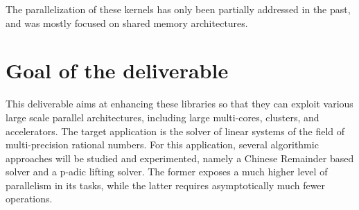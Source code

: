 The parallelization of these kernels has only been partially addressed
in the past, and was mostly focused on shared memory architectures.

\hypertarget{goal-of-the-deliverable}{%
\section*{Goal of the deliverable}\label{goal-of-the-deliverable}}

This deliverable aims at enhancing these libraries so that they can
exploit various large scale parallel architectures, including large
multi-cores, clusters, and accelerators. The target application is the
solver of linear systems of the field of multi-precision rational
numbers. For this application, several algorithmic approaches will be
studied and experimented, namely a Chinese Remainder based solver and a
p-adic lifting solver. The former exposes a much higher level of
parallelism in its tasks, while the latter requires asymptotically much
fewer operations.
